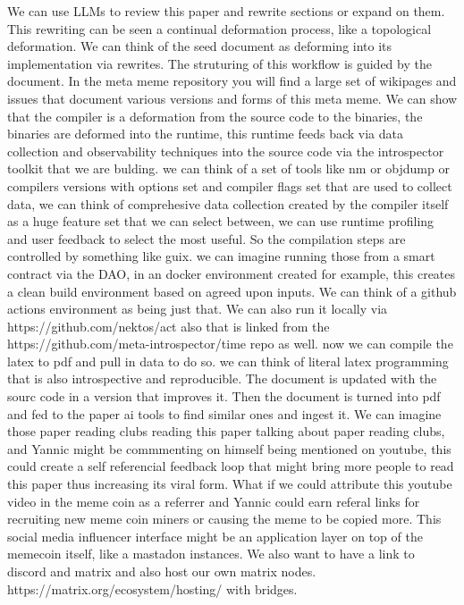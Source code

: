 \documentclass{article}
\begin{document}
We can use LLMs to review this paper and rewrite sections or expand on them.
This rewriting can be seen a continual deformation process, like a topological
deformation. We can think of the seed document as deforming into its implementation
via rewrites. The struturing of this workflow is guided by the document.
In the meta meme repository you will find a large set of wikipages and issues that document various versions and forms of this meta meme. 
We can show that the compiler is a deformation from the source code to the binaries, the binaries are deformed into the runtime, this runtime feeds back via data collection and observability techniques into the source code via the introspector toolkit that we are bulding.
we can think of a set of tools like nm or objdump or compilers versions  with options set and compiler flags set that are used to collect data, we can think of comprehesive data collection created by the compiler itself as a huge feature set that we can select between, we can use runtime profiling and user feedback to select the most useful.
So the compilation steps are controlled by something like guix.
we can imagine running those from a smart contract via the DAO, in an docker environment created for example, this
creates a clean build environment based on agreed upon inputs.
We can think of a github actions environment as being just that.
We can also run it locally via https://github.com/nektos/act also that is linked from the https://github.com/meta-introspector/time repo as well.
now we can compile the latex to pdf and pull in data to do so.
we can think of literal latex programming that is also introspective and
reproducible. The document is updated with the sourc code in a version that improves it. Then the document is turned into pdf and fed to the paper ai tools
to find similar ones and ingest it.
We can imagine those paper reading clubs reading this paper talking about
paper reading clubs, and Yannic might be commmenting on himself being mentioned on youtube, this could create a self referencial feedback loop that might bring
more people to read this paper thus increasing its viral form.
What if we could attribute this youtube video in the meme coin as a referrer
and Yannic could earn referal links for recruiting new meme coin miners
or causing the meme to be copied more. This social media influencer interface might be an application layer on top of the memecoin itself, like a mastadon instances.
We also want to have a link to discord and matrix and also host our own matrix nodes. https://matrix.org/ecosystem/hosting/ with bridges.
\end{document}
